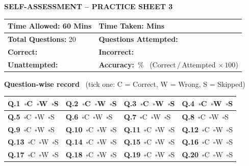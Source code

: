 \documentclass[11pt,a4paper]{article}
\begin{document}
\clearpage
\begin{center}{\Large\bfseries SELF-ASSESSMENT -- PRACTICE SHEET 3}\end{center}
\medskip
\renewcommand{\arraystretch}{1.9}
\noindent\begin{tabularx}{\linewidth}{|X|X|}\hline
\textbf{Time Allowed:} 60 Mins & \textbf{Time Taken:} \underline{\hspace{2.4cm}} Mins\\ \hline
\textbf{Total Questions:} 20 & \textbf{Questions Attempted:} \underline{\hspace{2cm}}\\ \hline
\textbf{Correct:} \underline{\hspace{2.6cm}} & \textbf{Incorrect:} \underline{\hspace{2.6cm}}\\ \hline
\textbf{Unattempted:} \underline{\hspace{2.2cm}} & \textbf{Accuracy:} \underline{\hspace{1.6cm}}\,\% \ {\footnotesize(Correct$\,/\,$Attempted$\,\times100$)}\\ \hline
\end{tabularx}
\renewcommand{\arraystretch}{1.0}
\bigskip
\textbf{Question-wise record} \ {\small(tick one: C = Correct, W = Wrong, S = Skipped)}\par\smallskip
{\small\renewcommand{\arraystretch}{1.55}
\noindent\begin{tabularx}{\linewidth}{|*{4}{>{\centering\arraybackslash}X|}}\hline
\textbf{Q.1}\ $\square$C\ $\square$W\ $\square$S & \textbf{Q.2}\ $\square$C\ $\square$W\ $\square$S & \textbf{Q.3}\ $\square$C\ $\square$W\ $\square$S & \textbf{Q.4}\ $\square$C\ $\square$W\ $\square$S \\ \hline
\textbf{Q.5}\ $\square$C\ $\square$W\ $\square$S & \textbf{Q.6}\ $\square$C\ $\square$W\ $\square$S & \textbf{Q.7}\ $\square$C\ $\square$W\ $\square$S & \textbf{Q.8}\ $\square$C\ $\square$W\ $\square$S \\ \hline
\textbf{Q.9}\ $\square$C\ $\square$W\ $\square$S & \textbf{Q.10}\ $\square$C\ $\square$W\ $\square$S & \textbf{Q.11}\ $\square$C\ $\square$W\ $\square$S & \textbf{Q.12}\ $\square$C\ $\square$W\ $\square$S \\ \hline
\textbf{Q.13}\ $\square$C\ $\square$W\ $\square$S & \textbf{Q.14}\ $\square$C\ $\square$W\ $\square$S & \textbf{Q.15}\ $\square$C\ $\square$W\ $\square$S & \textbf{Q.16}\ $\square$C\ $\square$W\ $\square$S \\ \hline
\textbf{Q.17}\ $\square$C\ $\square$W\ $\square$S & \textbf{Q.18}\ $\square$C\ $\square$W\ $\square$S & \textbf{Q.19}\ $\square$C\ $\square$W\ $\square$S & \textbf{Q.20}\ $\square$C\ $\square$W\ $\square$S \\ \hline
\end{tabularx}}
\end{document}
